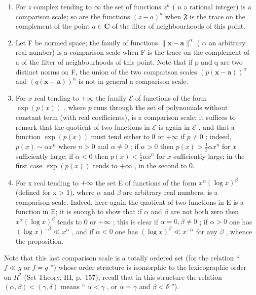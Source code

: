 \begin{enumerate}
\def\labelenumi{\arabic{enumi})}
\setcounter{enumi}{1}
\item
  For \(z\) complex tending to \(\infty\) the set of functions \(z^n\) ( \(n\) a rational integer) is a comparison scale; so are the functions \((z - a)^n\) when \(\mathfrak{F}\) is the trace on the complement of the point \(a \in \mathbf{C}\) of the filter of neighbourhoods of this point.
\item
  Let F be normed space; the family of functions \(\|\mathbf{x}-\mathbf{a}\|^{\alpha}\) ( \(\alpha\) an arbitrary real number) is a comparison scale when F is the trace on the complement of a of the filter of neighbourhoods of this point. Note that if p and q are two distinct norms on F, the union of the two comparison scales \(\left(p(\mathbf{x}-\mathbf{a})\right)^{\alpha}\) and \(\left(q(\mathbf{x}-\mathbf{a})\right)^{\alpha}\) is not in general a comparison scale.
\item
  For \(x\) real tending to \(+\infty\) the family \(\mathcal{E}\) of functions of the form \(\exp(p(x))\) , where \(p\) runs through the set of polynomials without constant term (with real coefficients), is a comparison scale: it suffices to remark that the quotient of two functions in \(\mathcal{E}\) is again in \(\mathcal{E}\) , and that a function \(\exp(p(x))\) must tend either to 0 or \(+\infty\) if \(p \neq 0\) ; indeed, \(p(x) \sim \alpha x^n\) where \(n > 0\) and \(\alpha \neq 0\) ; if \(\alpha > 0\) then \(p(x) > \frac{1}{2}\alpha x^n\) for \(x\) sufficiently large; if \(\alpha < 0\) then \(p(x) < \frac{1}{2}\alpha x^n\) for \(x\) sufficiently large; in the first case \(\exp(p(x))\) tends to \(+\infty\) , in the second to 0.
\item
  For x real tending to \(+\infty\) the set E of functions of the form \(x^{\alpha}(\log x)^{\beta}\) (defined for x \textgreater{} 1), where \(\alpha\) and \(\beta\) are arbitrary real numbers, is a comparison scale. Indeed, here again the quotient of two functions in E is a function in E; it is enough to show that if \(\alpha\) and \(\beta\) are not both zero then \(x^{\alpha}(\log x)^{\beta}\) tends to 0 or \(+\infty\) ; this is clear if \(\alpha = 0, \beta \neq 0\) ; if \(\alpha > 0\) one has \((\log x)^{-\beta} \ll x^{\alpha}\) , and if \(\alpha < 0\) one has \((\log x)^{\beta} \ll x^{-\alpha}\) for any \(\beta\) , whence the proposition.
\end{enumerate}

Note that this last comparison scale is a totally ordered set (for the relation `` \(f \ll g\) or \(f = g\) '') whose order structure is isomorphic to the lexicographic order on \(R^{2}\) (Set Theory, III, p.~157); recall that in this structure the relation \((\alpha, \beta) < (\gamma, \delta)\) means `` \(\alpha < \gamma\) , or \(\alpha = \gamma\) and \(\beta < \delta\) '').

